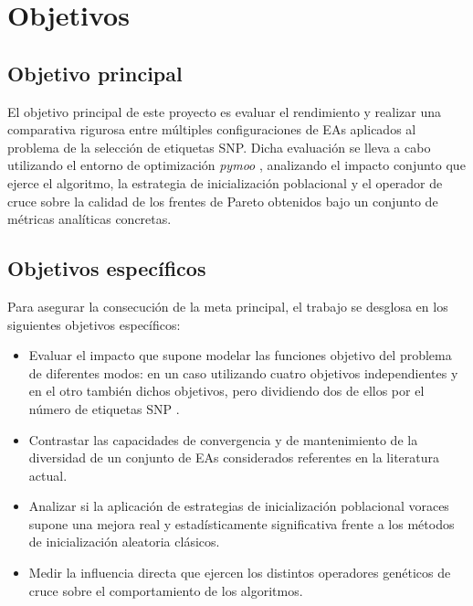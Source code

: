 \chapter{Objetivos}

\section{Objetivo principal}

El objetivo principal de este proyecto es evaluar el rendimiento y realizar una comparativa rigurosa entre múltiples configuraciones de EAs aplicados al problema de la selección de etiquetas SNP. Dicha evaluación se lleva a cabo utilizando el entorno de optimización \textit{pymoo} \cite{pymoo}, analizando el impacto conjunto que ejerce el algoritmo, la estrategia de inicialización poblacional y el operador de cruce sobre la calidad de los frentes de Pareto obtenidos bajo un conjunto de métricas analíticas concretas.

\section{Objetivos específicos}

Para asegurar la consecución de la meta principal, el trabajo se desglosa en los siguientes objetivos específicos:
\begin{itemize}
    \item Evaluar el impacto que supone modelar las funciones objetivo del problema de diferentes modos: en un caso utilizando cuatro objetivos independientes y en el otro también dichos objetivos, pero dividiendo dos de ellos por el número de etiquetas SNP \cite{ting2010multi, moqa2022assessing}.
    \item Contrastar las capacidades de convergencia y de mantenimiento de la diversidad de un conjunto de EAs considerados referentes en la literatura actual.
    \item Analizar si la aplicación de estrategias de inicialización poblacional voraces \cite{ting2010multi, moqa2022assessing} supone una mejora real y estadísticamente significativa frente a los métodos de inicialización aleatoria clásicos.
    \item Medir la influencia directa que ejercen los distintos operadores genéticos de cruce sobre el comportamiento de los algoritmos.
\end{itemize}